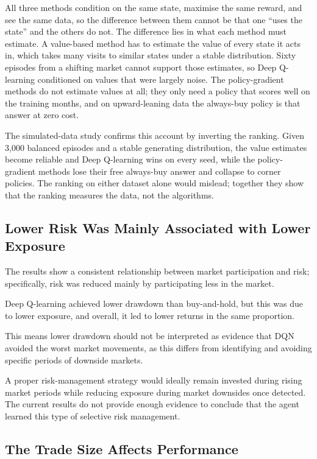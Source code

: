 All three methods condition on the same state, maximise the same reward,
and see the same data, so the difference between them cannot be that one
``uses the state'' and the others do not. The difference lies in what
each method must estimate. A value-based method has to estimate the
value of every state it acts in, which takes many visits to similar
states under a stable distribution. Sixty episodes from a shifting
market cannot support those estimates, so Deep Q-learning conditioned on
values that were largely noise. The policy-gradient methods do not
estimate values at all; they only need a policy that scores well on the
training months, and on upward-leaning data the always-buy policy is
that answer at zero cost.

The simulated-data study confirms this account by inverting the ranking.
Given 3,000 balanced episodes and a stable generating distribution, the
value estimates become reliable and Deep Q-learning wins on every seed,
while the policy-gradient methods lose their free always-buy answer and
collapse to corner policies. The ranking on either dataset alone would
mislead; together they show that the ranking measures the data, not the
algorithms.

\subsection{Lower Risk Was Mainly Associated with Lower Exposure}

The results show a consistent relationship between market participation
and risk; specifically, risk was reduced mainly by participating less in
the market.

Deep Q-learning achieved lower drawdown than buy-and-hold, but this was
due to lower exposure, and overall, it led to lower returns in the same
proportion.

This means lower drawdown should not be interpreted as evidence that DQN
avoided the worst market movements, as this differs from identifying and
avoiding specific periods of downside markets.

A proper risk-management strategy would ideally remain invested during
rising market periods while reducing exposure during market downsides
once detected. The current results do not provide enough evidence to
conclude that the agent learned this type of selective risk management.

\subsection{The Trade Size Affects Performance}

